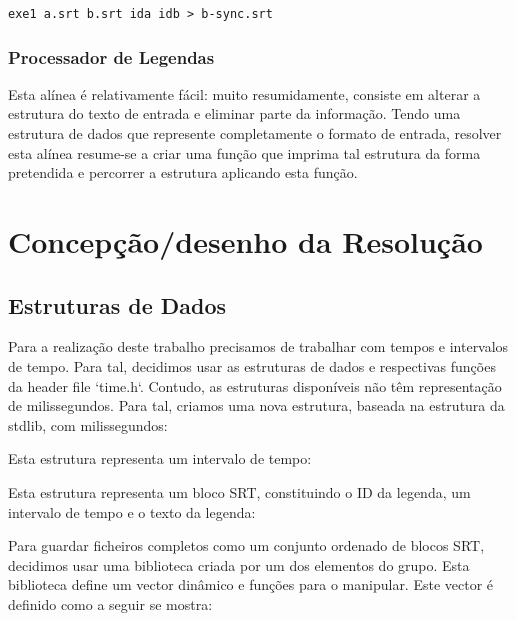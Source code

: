 \documentclass{report}
\begin{document}
\begin{verbatim}
exe1 a.srt b.srt ida idb > b-sync.srt
\end{verbatim}

\subsection{Processador de Legendas}

Esta alínea é relativamente fácil: muito resumidamente, consiste em alterar a estrutura do texto de entrada e eliminar parte da informação. Tendo uma estrutura de dados que represente completamente o formato de entrada, resolver esta alínea resume-se a criar uma função que imprima tal estrutura da forma pretendida e percorrer a estrutura aplicando esta função.

\chapter{Concepção/desenho da Resolução}

\section{Estruturas de Dados}

Para a realização deste trabalho precisamos de trabalhar com tempos e intervalos de tempo. Para tal, decidimos usar as estruturas de dados e respectivas funções da header file `time.h`. Contudo, as estruturas disponíveis não têm representação de milissegundos. Para tal, criamos uma nova estrutura, baseada na estrutura da stdlib, com milissegundos:



Esta estrutura representa um intervalo de tempo:



Esta estrutura representa um bloco SRT, constituindo o ID da legenda, um intervalo de tempo e o texto da legenda:



Para guardar ficheiros completos como um conjunto ordenado de blocos SRT, decidimos usar uma biblioteca criada por um dos elementos do grupo. Esta biblioteca define um vector dinâmico e funções para o manipular.
Este vector é definido como a seguir se mostra:


\end{document}
